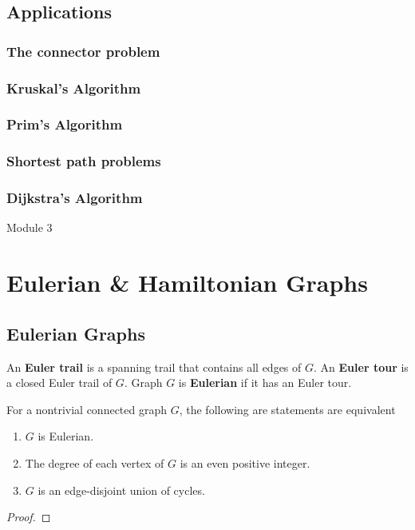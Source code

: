 \subsection{Applications}
\subsubsection{The connector problem}
\subsubsection{Kruskal's Algorithm}
\subsubsection{Prim's Algorithm}
\subsubsection{Shortest path problems}
\subsubsection{Dijkstra's Algorithm}

\setcounter{section}{5}
\pagebreak

{\Large Module 3}
\section{Eulerian \& Hamiltonian Graphs}
\setcounter{subsection}{1}
\subsection{Eulerian Graphs}
\begin{definition}
	An \textbf{Euler trail} is a spanning trail that contains all edges of $G$. An \textbf{Euler tour} is a closed Euler trail of $G$. Graph $G$ is \textbf{Eulerian} if it has an Euler tour.
\end{definition}

\begin{theorem}
	For a nontrivial connected graph $G$, the following are statements are equivalent
	\begin{enumerate}
		\item $G$ is Eulerian.
		\item The degree of each vertex of $G$ is an even positive integer.
		\item $G$ is an edge-disjoint union of cycles.
	\end{enumerate}
\end{theorem}
\begin{proof}
\end{proof}


